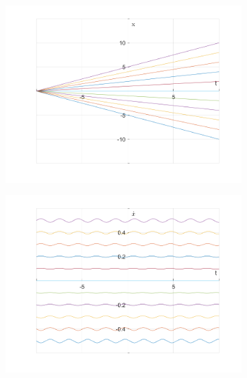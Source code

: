 \documentclass{article}
\begin{document}
	\begin{figure}[h!]
		\centering
		\begin{subfigure}[b]{0.48\linewidth}
			\includegraphics[width=\linewidth]{./SmallOscillations/S8/F3.png}
		\end{subfigure}
		\begin{subfigure}[b]{0.48\linewidth}
			\includegraphics[width=\linewidth]{./SmallOscillations/S8/F4.png}
		\end{subfigure}
	\end{figure}
	
\end{document}

